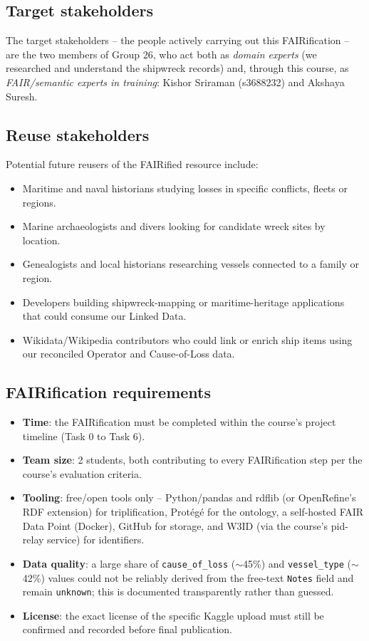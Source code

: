\subsection{Target stakeholders}
The target stakeholders -- the people actively carrying out this FAIRification -- are the two members of Group 26, who act both as \emph{domain experts} (we researched and understand the shipwreck records) and, through this course, as \emph{FAIR/semantic experts in training}: Kishor Sriraman (s3688232) and Akshaya Suresh.

\subsection{Reuse stakeholders}
Potential future reusers of the FAIRified resource include:
\begin{itemize}
    \item Maritime and naval historians studying losses in specific conflicts, fleets or regions.
    \item Marine archaeologists and divers looking for candidate wreck sites by location.
    \item Genealogists and local historians researching vessels connected to a family or region.
    \item Developers building shipwreck-mapping or maritime-heritage applications that could consume our Linked Data.
    \item Wikidata/Wikipedia contributors who could link or enrich ship items using our reconciled Operator and Cause-of-Loss data.
\end{itemize}

\subsection{FAIRification requirements}
\begin{itemize}
    \item \textbf{Time}: the FAIRification must be completed within the course's project timeline (Task 0 to Task 6).
    \item \textbf{Team size}: 2 students, both contributing to every FAIRification step per the course's evaluation criteria.
    \item \textbf{Tooling}: free/open tools only -- Python/pandas and rdflib (or OpenRefine's RDF extension) for triplification, Prot\'eg\'e for the ontology, a self-hosted FAIR Data Point (Docker), GitHub for storage, and W3ID (via the course's pid-relay service) for identifiers.
    \item \textbf{Data quality}: a large share of \texttt{cause\_of\_loss} ($\sim$45\%) and \texttt{vessel\_type} ($\sim$42\%) values could not be reliably derived from the free-text \texttt{Notes} field and remain \texttt{unknown}; this is documented transparently rather than guessed.
    \item \textbf{License}: the exact license of the specific Kaggle upload must still be confirmed and recorded before final publication.
\end{itemize}

